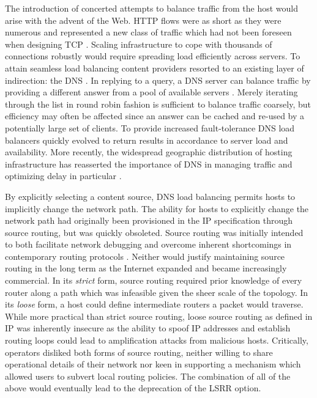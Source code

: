 The introduction of concerted attempts to balance traffic from the host would arise with the advent of the Web.
\ac{HTTP} flows were as short as they were numerous and represented a new class of traffic which had not been foreseen when designing \ac{TCP} \cite{Day:2010p187}.
Scaling infrastructure to cope with thousands of connections robustly would require spreading load efficiently across servers.
To attain seamless load balancing content providers resorted to an existing layer of indirection: the \ac{DNS} \cite{Mockapetris:1987p527}.
In replying to a query, a \ac{DNS} server can balance traffic by providing a different answer from a pool of available servers \cite{Brisco:1995p448}.
Merely iterating through the list in round robin fashion is sufficient to balance traffic coarsely, but efficiency may often be affected since an answer can be cached and re-used by a potentially large set of clients.
To provide increased fault-tolerance \ac{DNS} load balancers quickly evolved to return results in accordance to server load and availability.
More recently, the widespread geographic distribution of hosting infrastructure has reasserted the importance of \ac{DNS} in managing traffic and optimizing delay in particular \cite{Ager:2011p528}.

By explicitly selecting a content source, \ac{DNS} load balancing permits hosts to implicitly change the network path.
The ability for hosts to explicitly change the network path had originally been provisioned in the \ac{IP} specification through source routing, but was quickly obsoleted.
Source routing was initially intended to both facilitate network debugging and overcome inherent shortcomings in contemporary routing protocols \cite{Sunshine:1977p152}.
Neither would justify maintaining source routing in the long term as the Internet expanded and became increasingly commercial.
In its \emph{strict} form, source routing required prior knowledge of every router along a path which was infeasible given the sheer scale of the topology.
In its \emph{loose} form, a host could define intermediate routers a packet would traverse. 
While more practical than strict source routing, loose source routing as defined in \ac{IP} was inherently insecure as the ability to spoof \ac{IP} addresses and establish routing loops could lead to amplification attacks from malicious hosts.
Critically, operators disliked both forms of source routing, neither willing to share operational details of their network nor keen in supporting a mechanism which allowed users to subvert local routing policies.
The combination of all of the above would eventually lead to the deprecation of the \ac{LSRR} option.

